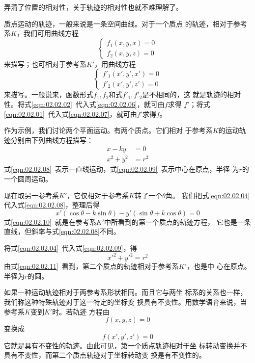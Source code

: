 \documentclass[../outline-of-mechanics.tex]{subfiles}
\begin{document}
弄清了位置的相对性，关于轨迹的相对性也就不难理解了。

质点运动的轨迹，一般来说是一条空间曲线。对于一个质点
的轨迹，相对于参考系$ K $，我们可用曲线方程
\begin{equation}\label{eqn:02.02.06}
  \left\{\begin{array}{l}
    f_1\left(x,y,x\right)=0 \\
    f_2\left(x,y,z\right)=0
  \end{array}\right.
\end{equation}
来描写；也可相对于参考系$K'$，用曲线方程
\clearpage
\begin{equation}\label{eqn:02.02.07}
  \left\{\begin{array}{l}
    f'_1\left(x',y',x'\right)=0 \\
    f'_2\left(x',y',z'\right)=0
  \end{array}\right.
\end{equation}
来描写。一般说来，函数形式$f_1,f_2$和式$f'_1,f'_2$是不相同的，这
就是轨迹的相对性。将式\eqref{eqn:02.02.02}~代入式\eqref{eqn:02.02.06}，就可由$f$求得
$f'$；将式\eqref{eqn:02.02.01}~代入式\eqref{eqn:02.02.07}，就可由$f'$求得$f$。

作为示例，我们讨论两个平面运动。有两个质点。它们相对
于参考系$K$的运动轨迹分别由下列曲线方程描写：
\begin{align}
  x-ky    & =0 \label{eqn:02.02.08}   \\
  x^2+y^2 & =r^2 \label{eqn:02.02.09}
\end{align}
式\eqref{eqn:02.02.08}~表示一直线运动，式\eqref{eqn:02.02.09}~表示中心在原点，半径
为$r$的一个圆周运动。

现在取另一参考系$K'$，它仅相对于参考系$K$转了一个$\theta$角。
我们把式\eqref{eqn:02.02.04}代入式\eqref{eqn:02.02.08}，整理后得
{\setlength{\mathindent}{4em}
\begin{equation}\label{eqn:02.02.10}
  x'\left(\cos\theta - k\sin\theta\right)-y'\left(\sin\theta + k\cos\theta\right)=0
\end{equation}}%
式\eqref{eqn:02.02.10}~就是在参考系$K'$中所看到的第一个质点的轨迹方程，
它也是一条直线，但斜率与式\eqref{eqn:02.02.08}不同。

将式\eqref{eqn:02.02.04}~代入式\eqref{eqn:02.02.09}，得
\begin{equation}\label{eqn:02.02.11}
  x'^2+y'^2=r^2
\end{equation}
由式\eqref{eqn:02.02.11}~看到，第二个质点的轨迹相对于参考系$K'$，也是中
心在原点。半径为$r$的圆。

如果一种运动轨迹相对于两参考系形状相同。而且它与两坐
标系的关系也一样，我们称这种特殊轨迹对于这一特定的坐标变
换具有不变性。用数学语育来说，当参考系$K$变到$K'$时。若轨迹
方程由
\begin{equation*}
  f\left(x,y,z\right)=0
\end{equation*}
变换成
\begin{equation*}
  f\left(x',y',z'\right)=0
\end{equation*}
它就是具有不变性的轨迹。由此可见，第一个质点轨迹相对于坐
标转动变换并不具有不变性，而第二个质点轨迹对于坐标转动变
换是有不变性的。
\end{document}
